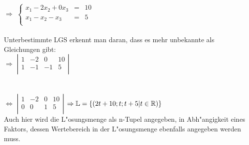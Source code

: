 $\Rightarrow$ $\left\{ \begin{array}{rcl}
x_{1}-2x_{2}+0x_{3}&=&10\\
x_{1}-x_{2}-x_{3}& =& 5\\
\end{array}\right.$\\
\\
Unterbestimmte LGS erkennt man daran, dass es mehr unbekannte als Gleichungen gibt:\\

$\Rightarrow$ $\left\vert \begin{array}{rccl}
1&-2&0&10\\
1&-1&-1& 5 \\
\end{array}\right\vert$\\
\\
\\
$\Leftrightarrow$ $\left\vert \begin{array}{rccl}
1&-2&0&10\\
0&0&1&5 \\
\end{array}\right\vert$  \qquad $\Rightarrow \mathbb{L}=\{(2t+10;t;t+5|t\in\mathbb{R}) \}$ \\

Auch hier wird die L"osungsmenge als n-Tupel angegeben, in Abh"angigkeit eines Faktors, dessen Wertebereich in der L"osungsmenge ebenfalls angegeben werden muss.\\\\
